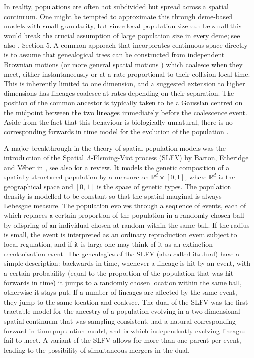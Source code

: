 \documentclass[reqno,draft]{amsart}
\numberwithin{equation}{section}
\theoremstyle{plain}
\theoremstyle{remark}
\newcommand{\R}{\mathbb{R}} %
\begin{document}
In reality, populations are often not subdivided but spread across a spatial continuum. One might be tempted to approximate this through deme-based models with small granularity, but since local population size can be small this would break the crucial assumption of large population size in every deme; see also \cite{E2008}, Section 5. %
A common approach that incorporates continuous space directly is to assume that genealogical trees can be constructed from independent Brownian motions (or more general spatial motions \cite{evans}) which coalesce when they meet, either instantaneously or at a rate proportional to their collision local time. This is inherently limited to one dimension, and a suggested extension to higher dimensions has lineages coalesce at rates depending on their separation. The position of the common ancestor is typically taken to be a Gaussian centred on the midpoint between the two lineages immediately before the coalescence event. Aside from the fact that this behaviour is biologically unnatural, %
there is no corresponding forwards in time model for the evolution of the population \cite{EBV2010}.

A major breakthrough in the theory of spatial population models was the introduction of the Spatial $\Lambda$-Fleming-Viot process (SLFV) by Barton, Etheridge and V\'eber in \cite{E2008,EBV2010}, see also \cite{EBV2013} for a review. It models the genetic composition of a spatially structured population by a measure on $\R^d\times [0,1]$, where $\R^d$ is the geographical space and $[0,1]$ is the space of genetic types. The population density is modelled to be constant so that the spatial marginal is always Lebesgue measure. The population evolves through a sequence of events, each of which replaces a certain proportion of the population in a randomly chosen ball by offspring of an individual chosen at random within the same ball. If the radius is small, the event is interpreted as an ordinary reproduction event subject to local regulation, and if it is large one may think of it as an extinction--recolonisation event. The genealogies of the SLFV (also called its dual) have a simple description: backwards in time, whenever a lineage is hit by an event, with a certain probability (equal to the proportion of the population that was hit forwards in time) it jumps to a randomly chosen location within the same ball, otherwise it stays put. If a number of lineages are affected by the same event, they jump to the same location and coalesce. The dual of the SLFV was the first tractable model for the ancestry of a population evolving in a two-dimensional spatial continuum that was sampling consistent, had a natural corresponding forward in time population model, and in which independently evolving lineages fail to meet. A variant of the SLFV allows for more than one parent per event, leading to the possibility of simultaneous mergers in the dual.
\end{document}
